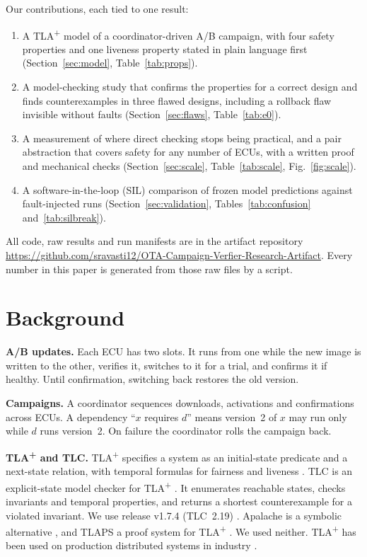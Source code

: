 \documentclass[journal]{IEEEtran}
\newcommand{\tla}{TLA\textsuperscript{+}}
\begin{document}
Our contributions, each tied to one result:
\begin{enumerate}
\item A \tla{} model of a coordinator-driven A/B campaign, with four safety properties and one liveness property stated in plain language first (Section~\ref{sec:model}, Table~\ref{tab:props}).
\item A model-checking study that confirms the properties for a correct design and finds counterexamples in three flawed designs, including a rollback flaw invisible without faults (Section~\ref{sec:flaws}, Table~\ref{tab:e0}).
\item A measurement of where direct checking stops being practical, and a pair abstraction that covers safety for any number of ECUs, with a written proof and mechanical checks (Section~\ref{sec:scale}, Table~\ref{tab:scale}, Fig.~\ref{fig:scale}).
\item A software-in-the-loop (SIL) comparison of frozen model predictions against fault-injected runs (Section~\ref{sec:validation}, Tables~\ref{tab:confusion} and~\ref{tab:silbreak}).
\end{enumerate}
All code, raw results and run manifests are in the artifact repository \url{https://github.com/sravasti12/OTA-Campaign-Verfier-Research-Artifact}. Every number in this paper is generated from those raw files by a script.

\section{Background}
\label{sec:background}

\textbf{A/B updates.} Each ECU has two slots. It runs from one while the new image is written to the other, verifies it, switches to it for a trial, and confirms it if healthy. Until confirmation, switching back restores the old version.

\textbf{Campaigns.} A coordinator sequences downloads, activations and confirmations across ECUs. A dependency ``$x$ requires $d$'' means version~2 of $x$ may run only while $d$ runs version~2. On failure the coordinator rolls the campaign back.

\textbf{\tla{} and TLC.} \tla{} specifies a system as an initial-state predicate and a next-state relation, with temporal formulas for fairness and liveness \cite{lamport1994}. TLC is an explicit-state model checker for \tla{} \cite{yu1999}. It enumerates reachable states, checks invariants and temporal properties, and returns a shortest counterexample for a violated invariant. We use release v1.7.4 (TLC~2.19) \cite{tlaplus}. Apalache is a symbolic alternative \cite{konnov2019}, and TLAPS a proof system for \tla{} \cite{cousineau2012}. We used neither. \tla{} has been used on production distributed systems in industry \cite{newcombe2015}.
\end{document}
